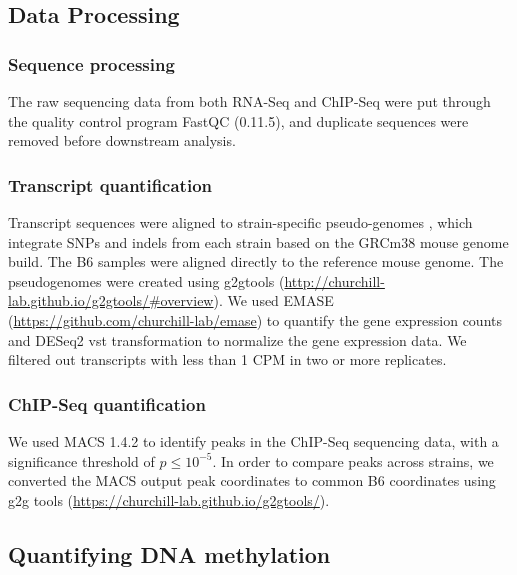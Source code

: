 \documentclass[
  11pt,
]{article}
\begin{document}
\hypertarget{data-processing}{%
\subsection{Data Processing}\label{data-processing}}

\hypertarget{sequence-processing}{%
\subsubsection{Sequence processing}\label{sequence-processing}}

The raw sequencing data from both RNA-Seq and ChIP-Seq were put through
the quality control program FastQC (0.11.5), and duplicate sequences
were removed before downstream analysis.

\hypertarget{transcript-quantification}{%
\subsubsection{Transcript
quantification}\label{transcript-quantification}}

Transcript sequences were aligned to strain-specific pseudo-genomes
\citep{pmid27309819}, which integrate SNPs and indels from each strain
based on the GRCm38 mouse genome build. The B6 samples were aligned
directly to the reference mouse genome. The pseudogenomes were created
using g2gtools
(\url{http://churchill-lab.github.io/g2gtools/\#overview}). We used
EMASE (\url{https://github.com/churchill-lab/emase})
\citep{pmid29444201} to quantify the gene expression counts and DESeq2
vst transformation \citep{love2014moderated} to normalize the gene
expression data. We filtered out transcripts with less than 1 CPM in two
or more replicates.

\hypertarget{chip-seq-quantification}{%
\subsubsection{ChIP-Seq quantification}\label{chip-seq-quantification}}

We used MACS 1.4.2 \citep{pmid18798982} to identify peaks in the
ChIP-Seq sequencing data, with a significance threshold of
\(p \leq 10^{-5}\). In order to compare peaks across strains, we
converted the MACS output peak coordinates to common B6 coordinates
using g2g tools (\url{https://churchill-lab.github.io/g2gtools/}).

\hypertarget{quantifying-dna-methylation}{%
\subsection{Quantifying DNA
methylation}\label{quantifying-dna-methylation}}
\end{document}
